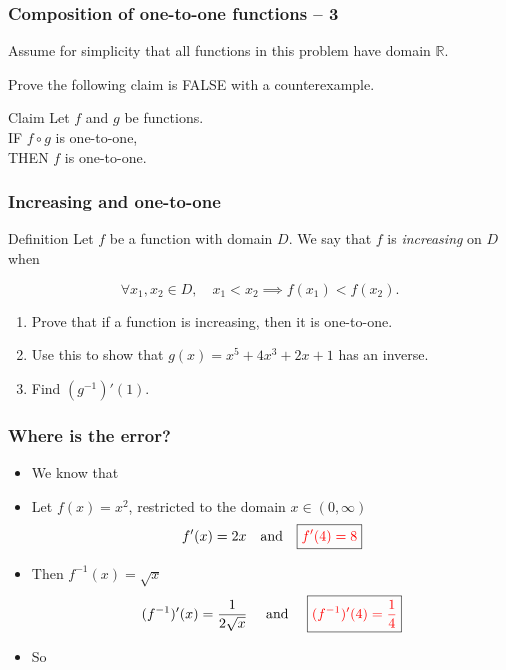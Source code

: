 \documentclass[14pt]{beamer}
\begin{document}
\begin{frame}[t]
	\frametitle{Composition of one-to-one functions -- 3}

	Assume for simplicity that all functions in this problem have domain
	$\mathbb{R}$.

	\vfill

	Prove the following claim is FALSE with a counterexample.

	\vfill

	\begin{block}{Claim }
		Let $f$ and $g$ be functions. \\ IF $f \circ g$ is one-to-one, \\ THEN $f$ is
		one-to-one.
	\end{block}

	\vfill
\end{frame}

\begin{frame}[t]
	\frametitle{Increasing and one-to-one}

	\begin{block}{Definition}
		Let $f$ be a function with domain $D$. We say that $f$ is \emph{increasing} on
		$D$ when

		\[
			\forall x_{1}, x_{2}\in D, \quad x_{1}<x_{2}\implies f(x_{1})<f(x_{2}).
		\]
	\end{block}

	\begin{enumerate}
		\item Prove that if a function is increasing, then it is one-to-one.

		\item Use this to show that $g(x) = x^{5}+ 4x^{3}+ 2x + 1$ has an inverse.

		\item Find $(g^{-1})'(1)$.
	\end{enumerate}
\end{frame}

\begin{frame}[t]
	\frametitle{Where is the error?}

	\begin{itemize}
		\item We know that 

		\item Let $\displaystyle f(x) = x^{2}$, restricted to the domain
			$\displaystyle x \in (0, \infty)$
			\[
				f'(x) = 2x \quad \text{and}\quad \boxed{{\color{red} f'(4) = 8}}
			\]

		\item Then $\displaystyle f^{-1}(x) = \sqrt{x}$
			\[
				(f^{-1})'(x) = \frac{1}{2\sqrt{x}}\quad \text{ and }\quad \boxed{{\color{red} (f^{-1})'(4) = \frac{1}{4}}}
			\]

		\item So 
	\end{itemize}
\end{frame}
\end{document}
